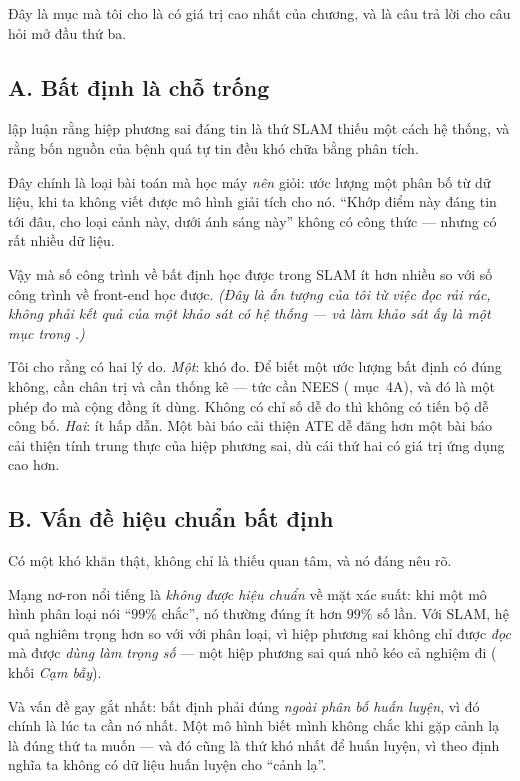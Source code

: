 \documentclass[../../vslam.tex]{subfiles}
\begin{document}
Đây là mục mà tôi cho là có giá trị cao nhất của chương, và là câu trả lời cho câu hỏi mở đầu thứ ba.

\subsection{A. Bất định là chỗ trống}

 lập luận rằng hiệp phương sai đáng tin là thứ SLAM thiếu một cách hệ thống, và rằng bốn nguồn của bệnh quá tự tin đều khó chữa bằng phân tích.

Đây chính là loại bài toán mà học máy \emph{nên} giỏi: ước lượng một phân bố từ dữ liệu, khi ta không viết được mô hình giải tích cho nó. ``Khớp điểm này đáng tin tới đâu, cho loại cảnh này, dưới ánh sáng này'' không có công thức --- nhưng có rất nhiều dữ liệu.

Vậy mà số công trình về bất định học được trong SLAM ít hơn nhiều so với số công trình về front-end học được. \emph{(Đây là ấn tượng của tôi từ việc đọc rải rác, không phải kết quả của một khảo sát có hệ thống --- và làm khảo sát ấy là một mục trong .)}

Tôi cho rằng có hai lý do. \emph{Một}: khó đo. Để biết một ước lượng bất định có đúng không, cần chân trị và cần thống kê --- tức cần NEES ( mục~4A), và đó là một phép đo mà cộng đồng ít dùng. Không có chỉ số dễ đo thì không có tiến bộ dễ công bố. \emph{Hai}: ít hấp dẫn. Một bài báo cải thiện ATE dễ đăng hơn một bài báo cải thiện tính trung thực của hiệp phương sai, dù cái thứ hai có giá trị ứng dụng cao hơn.

\subsection{B. Vấn đề hiệu chuẩn bất định}

Có một khó khăn thật, không chỉ là thiếu quan tâm, và nó đáng nêu rõ.

Mạng nơ-ron nổi tiếng là \emph{không được hiệu chuẩn} về mặt xác suất: khi một mô hình phân loại nói ``\(99\%\) chắc'', nó thường đúng ít hơn \(99\%\) số lần. Với SLAM, hệ quả nghiêm trọng hơn so với với phân loại, vì hiệp phương sai không chỉ được \emph{đọc} mà được \emph{dùng làm trọng số} --- một hiệp phương sai quá nhỏ kéo cả nghiệm đi ( khối \emph{Cạm bẫy}).

Và vấn đề gay gắt nhất: bất định phải đúng \emph{ngoài phân bố huấn luyện}, vì đó chính là lúc ta cần nó nhất. Một mô hình biết mình không chắc khi gặp cảnh lạ là đúng thứ ta muốn --- và đó cũng là thứ khó nhất để huấn luyện, vì theo định nghĩa ta không có dữ liệu huấn luyện cho ``cảnh lạ''.
\end{document}

